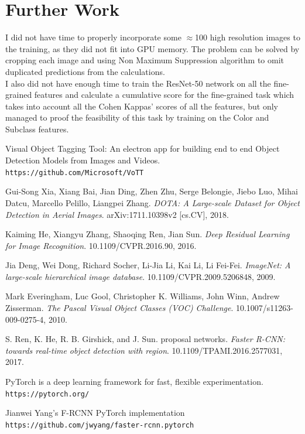 \documentclass[]{article}
\begin{document}
\section{Further Work}
I did not have time to properly incorporate some $\approx$100 high resolution images to the training, as they did not fit into GPU memory. 
The problem can be solved by cropping each image and using Non Maximum Suppression algorithm to omit duplicated predictions from the calculations.
\\
I also did not have enough time to train the ResNet-50 network on all the fine-grained features and calculate a cumulative score for the fine-grained task which takes into account all the Cohen Kappas' scores of all the features, but only managed to proof the feasibility of this task by training on the Color and Subclass features.

\begin{thebibliography}{9}
	Visual Object Tagging Tool: An electron app for building end to end Object Detection Models from Images and Videos.
	\\\texttt{https://github.com/Microsoft/VoTT}
	
	Gui-Song Xia, Xiang Bai, Jian Ding, Zhen Zhu, Serge Belongie, Jiebo Luo, Mihai Datcu, Marcello Pelillo, Liangpei Zhang.
	\textit{DOTA: A Large-scale Dataset for Object Detection in Aerial Images}. 
	arXiv:1711.10398v2 [cs.CV], 2018.
	
	Kaiming He, Xiangyu Zhang, Shaoqing Ren, Jian Sun.
	\textit{Deep Residual Learning for Image Recognition}. 
	10.1109/CVPR.2016.90, 2016.
	
	 Jia Deng, Wei Dong, Richard Socher, Li-Jia Li, Kai Li, Li Fei-Fei.
	\textit{ImageNet: A large-scale hierarchical image database}. 
	10.1109/CVPR.2009.5206848, 2009.
	
	Mark Everingham, Luc Gool, Christopher K. Williams, John Winn, Andrew Zisserman.
	\textit{The Pascal Visual Object Classes (VOC) Challenge}. 
	10.1007/s11263-009-0275-4, 2010.
	
	S. Ren, K. He, R. B. Girshick, and J. Sun.
	proposal networks.
	\textit{Faster R-CNN: towards real-time object detection with region}. 
	10.1109/TPAMI.2016.2577031, 2017.
	
	PyTorch is a deep learning framework for fast, flexible experimentation.
	\\\texttt{https://pytorch.org/}
	
	Jianwei Yang's F-RCNN PyTorch implementation
	\\\texttt{https://github.com/jwyang/faster-rcnn.pytorch}
	
\end{thebibliography}
\end{document}
